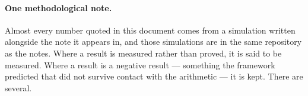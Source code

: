 \paragraph{One methodological note.} Almost every number quoted in this document
comes from a simulation written alongside the note it appears in, and those
simulations are in the same repository as the notes. Where a result is measured
rather than proved, it is said to be measured. Where a result is a negative
result --- something the framework predicted that did not survive contact with the
arithmetic --- it is kept. There are several.
